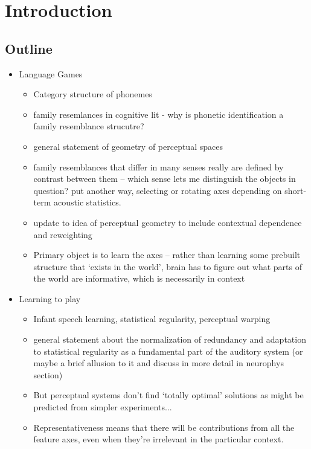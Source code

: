 
% 

\section{Introduction}
\begin{multicols}{2}

\subsection{Outline}

\begin{itemize}
	\item Language Games
	\begin{itemize}
		\item Category structure of phonemes
		\item family resemlances in cognitive lit - why is phonetic identification a family resemblance strucutre?
		\item general statement of geometry of perceptual spaces
		\item family resemblances that differ in many senses really are defined by contrast between them -- which sense lets me distinguish the objects in question? put another way, selecting or rotating axes depending on short-term acoustic statistics.
		\item update to idea of perceptual geometry to include contextual dependence and reweighting
		\item Primary object is to learn the axes -- rather than learning some prebuilt structure that `exists in the world', brain has to figure out what parts of the world are informative, which is necessarily in context
	\end{itemize}

	\item Learning to play
	\begin{itemize}
		\item Infant speech learning, statistical regularity, perceptual warping
		\item general statement about the normalization of redundancy and adaptation to statistical regularity as a fundamental part of the auditory system (or maybe a brief allusion to it and discuss in more detail in neurophys section)
		\item But perceptual systems don't find `totally optimal' solutions as might be predicted from simpler experiments... 
		\item Representativeness means that there will be contributions from all the feature axes, even when they're irrelevant in the particular context.
	\end{itemize}


\end{itemize}
\end{multicols}
